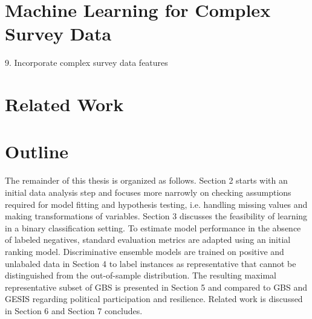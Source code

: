 \section{Machine Learning for Complex Survey Data}

9.   Incorporate complex survey data features 



\section{Related Work}

\section{Outline}

The remainder of this thesis is organized as follows. Section 2 starts with an initial data analysis step and focuses more narrowly on checking assumptions required for model fitting and hypothesis testing, i.e. handling missing values and making transformations of variables. Section 3 discusses the feasibility of learning in a binary classification setting. To estimate model performance in the absence of labeled negatives, standard evaluation metrics are adapted using an initial ranking model. Discriminative ensemble models are trained on positive and unlabaled data in Section 4 to label instances as representative that cannot be distinguished from the out-of-sample distribution. The resulting maximal representative subset of GBS is presented in Section 5 and compared to GBS and GESIS regarding political participation and resilience. Related work is discussed in Section 6 and Section 7 concludes.
